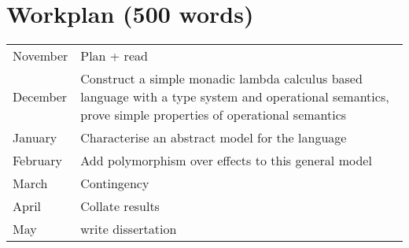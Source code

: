 \documentclass[11pt]{article}
\newcommand\comment[1]{}
\begin{document}
\section{Workplan (500 words)}
\comment{Project students have approximately 26 weeks between the approval of 
the proposal by the Head of Department, and the submission of the dissertation. This section
should account for what you intend to do during that time. You should divide the time into two-week chunks including dates, and 
describe the work to be done (and, as relevant, milestones to be 
achieved) in each chunk. You should leave two 
chunks for writing a project dissertation. You should leave 1 chunk for contingencies.} 

\begin{tabular}{|p{3cm}||p{12cm}|}
\hline
	November & Plan + read\\ 
	December & Construct a simple monadic lambda calculus based language with a type system and operational semantics, prove  simple properties of operational semantics \\
	January &  Characterise an abstract model for the language \\
	February & Add polymorphism over effects to this general model \\
	March & Contingency \\
	April &  Collate results\\
	May & write dissertation \\ 
\hline
\end{tabular}

\newpage
\appendix
\end{document}
